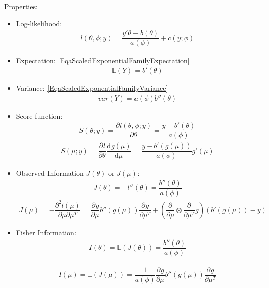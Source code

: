 Properties:
\begin{itemize}[topsep=2pt,itemsep=0pt]
    \item Log-likelihood:
    \begin{align}
        l(\theta ,\phi ;y) =\dfrac{y'\theta -b(\theta )}{a(\phi)}+c(y;\phi )
    \end{align}
    
    \item Expectation: \autoref{EqaScaledExponentialFamilyExpectation}
    \begin{align}
        \mathbb{E}(Y)=b'(\theta )
    \end{align}
    \item Variance: \autoref{EqaScaledExponentialFamilyVariance}
    \begin{align}
         var(Y)=a(\phi )b''(\theta )
    \end{align}

    \item Score function:
    \begin{align}
         S(\theta ;y)=\dfrac{\partial^{} l(\theta ,\phi ;y)}{\partial \theta ^{}}= \dfrac{y-b'(\theta )}{a(\phi )}
    \end{align}
    \begin{align}
        S(\mu ;y)=\dfrac{\partial^{} l}{\partial \theta ^{}}\dfrac{\mathrm{d}^{} g(\mu )}{\mathrm{d}\mu ^{}}=\dfrac{y-b'(g(\mu ))}{a(\phi )}g'(\mu ) 
    \end{align}
    
    \item Observed Information $ J(\theta ) $ or $ J(\mu ) $:
    \begin{align}
        J(\theta )=-l''(\theta )= \dfrac{b''(\theta )}{a(\phi )}
    \end{align}
    \begin{align}
        J(\mu )=-\dfrac{\partial^{2}l(\mu ) }{\partial \mu \partial \mu ^T}=\dfrac{\partial^{} g}{\partial \mu ^{}}b''(g(\mu ))\dfrac{\partial^{} g}{\partial \mu ^T}+\left( \dfrac{\partial^{} }{\partial \mu }\otimes \dfrac{\partial^{} }{\partial \mu ^T}  g\right)(b'(g(\mu ))-y)
    \end{align}
  
    \item Fisher Information:
    \begin{align}
        I(\theta )=\mathbb{E}(J(\theta ))=\dfrac{b''(\theta )}{a(\phi )}
    \end{align}
    
    \begin{align}
        I(\mu )=\mathbb{E}(J(\mu ))= \dfrac{1}{a(\phi )}\dfrac{\partial^{} g}{\partial \mu ^{}}b''(g(\mu ))\dfrac{\partial^{} g}{\partial \mu ^T}
    \end{align}
    
\end{itemize}

